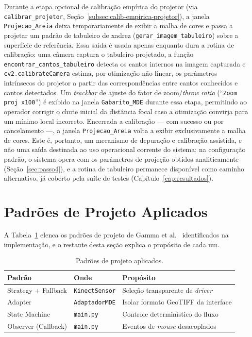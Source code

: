 Durante a etapa opcional de calibração empírica do projetor
(via \texttt{calibrar\_projetor}, Seção~\ref{subsec:calib-empirica-projetor}), a janela
\texttt{Projecao\_Areia} deixa temporariamente de exibir a
malha de cores e passa a projetar um padrão de tabuleiro de
xadrez (\texttt{gerar\_imagem\_tabuleiro}) sobre a superfície de
referência. Essa saída é usada apenas enquanto dura a rotina de
calibração: uma câmera captura o tabuleiro projetado, a função
\texttt{encontrar\_cantos\_tabuleiro} detecta os cantos internos na
imagem capturada e \texttt{cv2.calibrateCamera} estima, por
otimização não linear, os parâmetros intrínsecos do projetor a partir
das correspondências entre cantos conhecidos e cantos detectados. Um
\textit{trackbar} de ajuste do fator de zoom/\textit{throw ratio}
(``\texttt{Zoom proj~x100}'') é exibido na janela \texttt{Gabarito\_MDE}
durante essa etapa, permitindo ao operador corrigir o chute inicial da
distância focal caso a otimização convirja para um mínimo local
incorreto. Encerrada a calibração — com sucesso ou por cancelamento —,
a janela \texttt{Projecao\_Areia} volta a exibir exclusivamente a
malha de cores. Este é, portanto, um mecanismo de depuração e
calibração assistida, e não uma saída destinada ao uso operacional
corrente do sistema; na configuração padrão, o sistema opera com os
parâmetros de projeção obtidos analiticamente
(Seção~\ref{sec:passo4}), e a rotina de tabuleiro permanece disponível
como caminho alternativo, já coberto pela suíte de testes
(Capítulo~\ref{cap:resultados}).

\section{Padrões de Projeto Aplicados}
\label{sec:patterns}

A Tabela~\ref{tab:patterns} elenca os padrões de projeto de
Gamma et al.~ identificados na implementação, e o
restante desta seção explica o propósito de cada um.

\begin{table}[!ht]
\centering
\caption{Padrões de projeto aplicados.}
\label{tab:patterns}
\begin{tabular}{lll}
\toprule
\textbf{Padrão} & \textbf{Onde} & \textbf{Propósito} \\
\midrule
Strategy + Fallback & \texttt{KinectSensor} & Seleção transparente de \textit{driver} \\
Adapter             & \texttt{AdaptadorMDE} & Isolar formato GeoTIFF da interface \\
State Machine       & \texttt{main.py}      & Controle determinístico do fluxo \\
Observer (Callback) & \texttt{main.py}      & Eventos de \emph{mouse} desacoplados \\
\bottomrule
\end{tabular}
\end{table}

